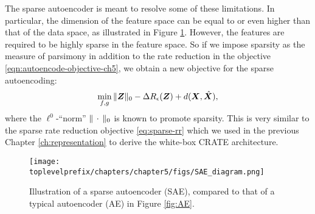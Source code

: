 \documentclass[\toplevelprefix/book-main.tex]{subfiles}
\begin{document}
The sparse autoencoder is meant to resolve some of these limitations. In
particular, the dimension of the feature space can be equal to or
even higher than that of the data space, as illustrated in Figure
\ref{fig:SAE}. However, the features are required to be highly
sparse in the feature space. So if we impose sparsity as the measure
of parsimony in addition to the rate reduction in the objective
\eqref{eqn:autoencode-objective-ch5}, we obtain a new objective for
the sparse autoencoding:
\begin{equation}
  \min_{f, g}
  \|\bm{Z}\|_0 - \Delta R_{\epsilon}(\bm{Z}) + d(\bm{X}, \hat {\bm{X}}),
  \label{eqn:autoencode-sparse}
\end{equation}
where the $\ell^0$-``norm'' $\|\,\cdot\,\|_0$ is known to promote sparsity.
This is very similar to the sparse rate reduction objective
\eqref{eq:sparse-rr} which we used in the previous Chapter \ref{ch:representation} to derive the white-box CRATE architecture.

\begin{figure}
  \centering
  \texttt{[image: \\toplevelprefix/chapters/chapter5/figs/SAE\_diagram.png]}
  \caption{Illustration of a sparse autoencoder (SAE), compared to
  that of a typical autoencoder (AE) in Figure \ref{fig:AE}. }
  \label{fig:SAE}
\end{figure}

\end{document}
